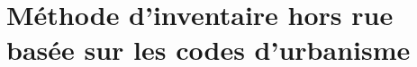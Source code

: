 \section{Méthode d'inventaire hors rue basée sur les codes d'urbanisme}\label{sec:meth_urb_based_inventory}
